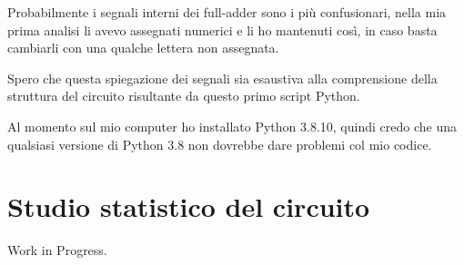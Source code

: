 \documentclass[12pt, letterpaper]{article}
\begin{document}
Probabilmente i segnali interni dei full-adder sono i più confusionari, nella mia prima analisi li avevo assegnati numerici e li ho mantenuti così, in caso basta cambiarli con una qualche lettera non assegnata.

Spero che questa spiegazione dei segnali sia esaustiva alla comprensione della struttura del circuito risultante da questo primo script Python.

Al momento sul mio computer ho installato Python 3.8.10, quindi credo che una qualsiasi versione di Python 3.8 non dovrebbe dare problemi col mio codice.

\section{Studio statistico del circuito}

Work in Progress.
\end{document}
